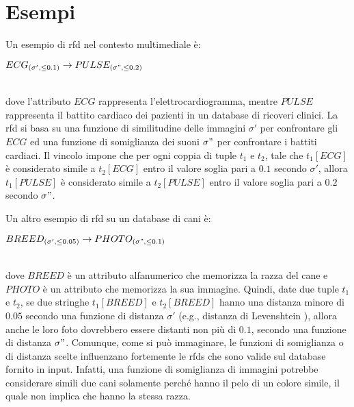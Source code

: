 \section{Esempi}
Un esempio di \acrshort{rfd} nel contesto multimediale \`{e}:
\\\centerline{$ECG_{(\sigma',\leq0.1)}\rightarrow PULSE_{(\sigma",\leq0.2)}$}
\\dove l'attributo $ECG$ rappresenta l'elettrocardiogramma, mentre $PULSE$ rappresenta il battito cardiaco dei pazienti in un database di ricoveri clinici. La \acrshort{rfd} si basa su una funzione di similitudine delle immagini $\sigma'$ per confrontare gli $ECG$ ed una funzione di somiglianza dei suoni $\sigma"$ per confrontare i battiti cardiaci. Il vincolo impone che per ogni coppia di tuple $t_1$ e $t_2$, tale che $t_1[ECG]$ \`{e} considerato simile a $t_2[ECG]$ entro il valore soglia pari a $0.1$ secondo $\sigma'$, allora $t_1[PULSE]$ \`{e} considerato simile a $t_2[PULSE]$ entro il valore soglia pari a $0.2$ secondo $\sigma"$.\par
Un altro esempio di \acrshort{rfd} su un database di cani \`{e}:
\\\centerline{$BREED_{(\sigma',\leq0.05)}\rightarrow PHOTO_{(\sigma",\leq0.1)}$}
\\dove $BREED$ \`{e} un attributo alfanumerico che memorizza la razza del cane e $PHOTO$ \`{e} un attributo che memorizza la sua immagine. Quindi, date due tuple $t_1$ e $t_2$, se due stringhe $t_1[BREED]$ e $t_2[BREED]$ hanno una distanza minore di $0.05$ secondo una funzione di distanza $\sigma'$ (e.g., distanza di Levenshtein \cite{binarycodes4correcting}), allora anche le loro foto dovrebbero essere distanti non pi\`{u} di $0.1$, secondo una funzione di distanza $\sigma"$. Comunque, come si pu\`{o} immaginare, le funzioni di somiglianza o di distanza scelte influenzano fortemente le \acrshort{rfds} che sono valide sul database fornito in input. Infatti, una funzione di somiglianza di immagini potrebbe considerare simili due cani solamente perch\'{e} hanno il pelo di un colore simile, il quale non implica che hanno la stessa razza.\par

